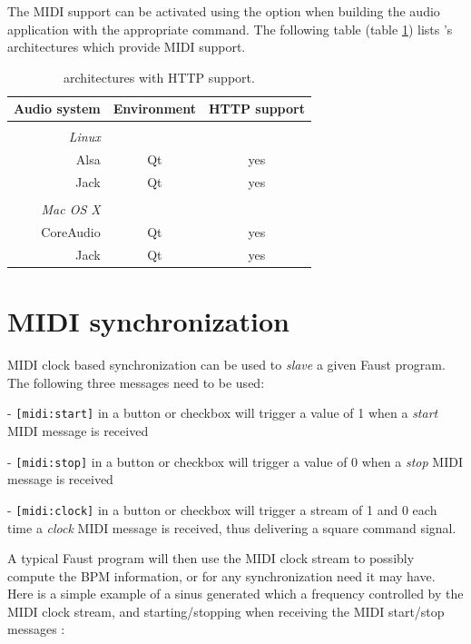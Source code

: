 The MIDI support can be activated using the  option when building the audio application with the appropriate  command. The following table (table \ref{tab:midiarch}) lists \faust's architectures which provide MIDI support. 

\begin{table}[htp]
\begin{center}
\begin{tabular}{rcc}
\hline
\bf{Audio system} 	& \bf{Environment} & \bf{HTTP support}	\\
\hline
\\
\emph{Linux}\\
Alsa  		& Qt		& yes\\
Jack 			& Qt		& yes\\
\\
\emph{Mac OS X} \\
CoreAudio 	& Qt 	 & yes\\
Jack 			& Qt  & yes\\
\hline
\end{tabular}
\end{center}
\caption{\faust architectures with HTTP support.}
\label{tab:midiarch}
\end{table}

\section{MIDI synchronization}

MIDI clock based synchronization can be used to  \emph{slave} a given Faust program. The following three messages need to be used:

- \lstinline'[midi:start]' in a button or checkbox will trigger a value of 1 when a \emph{start} MIDI message is received

- \lstinline'[midi:stop]' in a button or checkbox will trigger a value of 0 when a \emph{stop} MIDI message is received

- \lstinline'[midi:clock]' in a button or checkbox will trigger a stream of 1 and 0 each time a \emph{clock} MIDI message is received, thus delivering a square command signal.

A typical Faust program will then use the MIDI clock stream to possibly compute the BPM information, or for any synchronization need it may have.  Here is a simple example of a sinus generated which a frequency controlled by the MIDI clock stream, and starting/stopping when receiving the MIDI start/stop messages :

